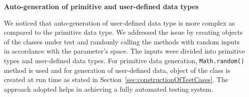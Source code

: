 

\textbf{Auto-generation of primitive and user-defined data types}

We noticed that auto-generation of user-defined data type is more complex as compared to the primitive data type. We addressed the issue by creating objects of the classes under test and randomly calling the methods with random inputs in accordance with the parameter's space. The inputs were divided into primitive types and user-defined data types.  For primitive data generation, \verb+Math.random()+ method is used and for generation of user-defined data, object of the class is created at run time as stated in Section~\ref{sec:constructionOfTestCases}. The approach adopted helps in achieving a fully automated testing system.\\



